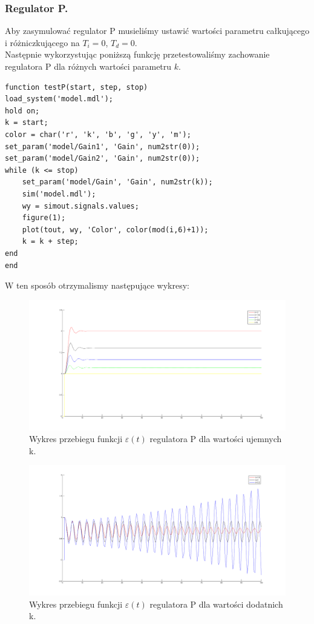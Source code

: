 \documentclass[a4paper,10pt]{article}
\begin{document}
\subsubsection{Regulator P.}\label{sec:regP}
Aby zasymulować regulator P musieliśmy ustawić wartości parametru całkującego i różniczkującego na $T_{i}=0$, $T_{d}=0$. \\
Następnie wykorzystując poniższą funkcję przetestowaliśmy zachowanie regulatora P dla różnych wartości parametru $k$. \\
\begin{lstlisting}[caption=Funkcja testująca regulator P.]
function testP(start, step, stop)
load_system('model.mdl');
hold on;
k = start;
color = char('r', 'k', 'b', 'g', 'y', 'm');
set_param('model/Gain1', 'Gain', num2str(0));
set_param('model/Gain2', 'Gain', num2str(0));
while (k <= stop)
    set_param('model/Gain', 'Gain', num2str(k));
    sim('model.mdl');
    wy = simout.signals.values;
    figure(1);
    plot(tout, wy, 'Color', color(mod(i,6)+1));
    k = k + step;
end
end
\end{lstlisting}
W ten sposób otrzymalismy następujące wykresy: \\
\begin{figure}[!h]
    \centering
	\includegraphics[width=130mm]{CW2-regulatorP-eu.png}
	\caption{Wykres przebiegu funkcji $\varepsilon(t)$ regulatora P dla wartości ujemnych k.}
    \label{fig:regulatorPeu}
\end{figure}
\begin{figure}[!h]
    \centering
	\includegraphics[width=130mm]{CW2-regulatorP-ed.png}
	\caption{Wykres przebiegu funkcji $\varepsilon(t)$ regulatora P dla wartości dodatnich k.}
    \label{fig:regulatorPed}
\end{figure}
\end{document}

